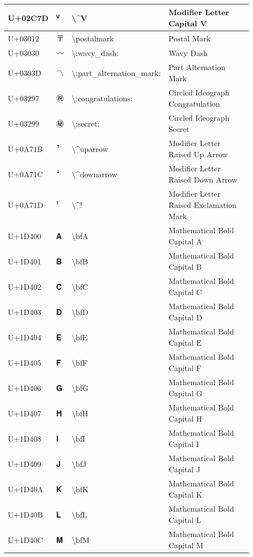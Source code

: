 \begin{table}[h]
\begin{tabulary}{\linewidth}{|L|L|L|L|}
\hline
U+02C7D & ⱽ & {\textbackslash}{\textasciicircum}V & Modifier Letter Capital V \\
\hline
U+03012 & 〒 & {\textbackslash}postalmark & Postal Mark \\
\hline
U+03030 & 〰 & {\textbackslash}:wavy\_dash: & Wavy Dash \\
\hline
U+0303D & 〽 & {\textbackslash}:part\_alternation\_mark: & Part Alternation Mark \\
\hline
U+03297 & ㊗ & {\textbackslash}:congratulations: & Circled Ideograph Congratulation \\
\hline
U+03299 & ㊙ & {\textbackslash}:secret: & Circled Ideograph Secret \\
\hline
U+0A71B & ꜛ & {\textbackslash}{\textasciicircum}uparrow & Modifier Letter Raised Up Arrow \\
\hline
U+0A71C & ꜜ & {\textbackslash}{\textasciicircum}downarrow & Modifier Letter Raised Down Arrow \\
\hline
U+0A71D & ꜝ & {\textbackslash}{\textasciicircum}! & Modifier Letter Raised Exclamation Mark \\
\hline
U+1D400 & 𝐀 & {\textbackslash}bfA & Mathematical Bold Capital A \\
\hline
U+1D401 & 𝐁 & {\textbackslash}bfB & Mathematical Bold Capital B \\
\hline
U+1D402 & 𝐂 & {\textbackslash}bfC & Mathematical Bold Capital C \\
\hline
U+1D403 & 𝐃 & {\textbackslash}bfD & Mathematical Bold Capital D \\
\hline
U+1D404 & 𝐄 & {\textbackslash}bfE & Mathematical Bold Capital E \\
\hline
U+1D405 & 𝐅 & {\textbackslash}bfF & Mathematical Bold Capital F \\
\hline
U+1D406 & 𝐆 & {\textbackslash}bfG & Mathematical Bold Capital G \\
\hline
U+1D407 & 𝐇 & {\textbackslash}bfH & Mathematical Bold Capital H \\
\hline
U+1D408 & 𝐈 & {\textbackslash}bfI & Mathematical Bold Capital I \\
\hline
U+1D409 & 𝐉 & {\textbackslash}bfJ & Mathematical Bold Capital J \\
\hline
U+1D40A & 𝐊 & {\textbackslash}bfK & Mathematical Bold Capital K \\
\hline
U+1D40B & 𝐋 & {\textbackslash}bfL & Mathematical Bold Capital L \\
\hline
U+1D40C & 𝐌 & {\textbackslash}bfM & Mathematical Bold Capital M \\

\end{tabulary}
\end{table}
